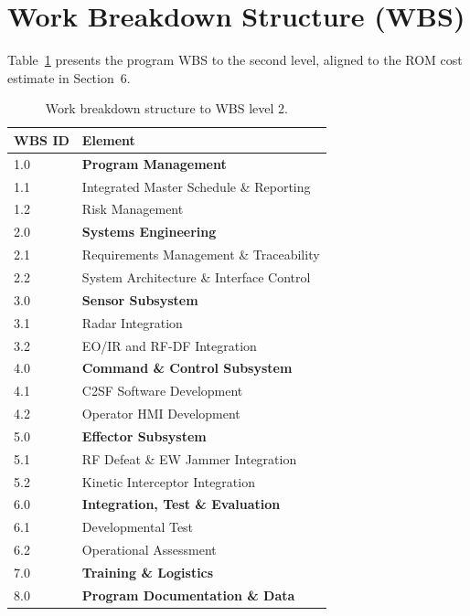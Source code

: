 \section{Work Breakdown Structure (WBS)}

Table~\ref{tab:wbs} presents the program WBS to the second level, aligned to the ROM cost estimate in Section~6.

\begin{table}[htbp]
\centering
\footnotesize
\begin{tabularx}{\linewidth}{@{}l >{\raggedright\arraybackslash}X@{}}
\toprule
\rowcolor{accentlight}
\textbf{WBS ID} & \textbf{Element} \\
\midrule
1.0 & \textbf{Program Management} \\
1.1 & \hspace{4mm}Integrated Master Schedule \& Reporting \\
1.2 & \hspace{4mm}Risk Management \\
2.0 & \textbf{Systems Engineering} \\
2.1 & \hspace{4mm}Requirements Management \& Traceability \\
2.2 & \hspace{4mm}System Architecture \& Interface Control \\
3.0 & \textbf{Sensor Subsystem} \\
3.1 & \hspace{4mm}Radar Integration \\
3.2 & \hspace{4mm}EO/IR and RF-DF Integration \\
4.0 & \textbf{Command \& Control Subsystem} \\
4.1 & \hspace{4mm}C2SF Software Development \\
4.2 & \hspace{4mm}Operator HMI Development \\
5.0 & \textbf{Effector Subsystem} \\
5.1 & \hspace{4mm}RF Defeat \& EW Jammer Integration \\
5.2 & \hspace{4mm}Kinetic Interceptor Integration \\
6.0 & \textbf{Integration, Test \& Evaluation} \\
6.1 & \hspace{4mm}Developmental Test \\
6.2 & \hspace{4mm}Operational Assessment \\
7.0 & \textbf{Training \& Logistics} \\
8.0 & \textbf{Program Documentation \& Data} \\
\bottomrule
\end{tabularx}
\caption{Work breakdown structure to WBS level 2.}
\label{tab:wbs}
\end{table}

\clearpage

